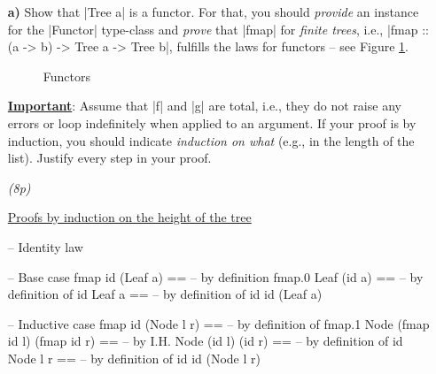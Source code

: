 \documentclass[a4,11pt]{article}
\newif\ifsol
\newcommand{\points}[1]{\hfill \textsl{({#1}p)}}
\begin{document}
\begin{enumerate}

\item[\textbf{a)}] %
  Show that |Tree a| is a functor. For that, you should \emph{provide} an
  instance for the |Functor| type-class and \emph{prove} that |fmap| for
  \emph{finite trees}, i.e., |fmap :: (a -> b) -> Tree a -> Tree b|, fulfills
  the laws for functors -- see Figure \ref{fig:functor}.

  \begin{figure}[t]
  \caption{Functors \label{fig:functor}}
  \end{figure}


   \ifsol
   \begin{code}
   instance Functor Tree where
       fmap  f  (Leaf a)      =  Leaf (f a)
       fmap  f  (Node t1 t2)  =  Node (fmap f t1) (fmap f t2)
   \end{code}
   \fi


  \underline{\textbf{Important}}:
  Assume that |f| and |g| are total, i.e., they do not raise any errors or loop
  indefinitely when applied to an argument. If your proof is by induction,
  you should indicate \emph{induction on what} (e.g., in the length of the
  list). Justify every step in your proof.

  \points{8}

  \ifsol
  \underline{Proofs by induction on the height of the tree}

  \begin{code}
  -- Identity law

  -- Base case
      fmap id (Leaf a)          ==
  --  { by definition fmap.0 }
      Leaf (id a)               ==
  --  { by definition of id }
      Leaf a                    ==
  --  { by definition of id }
      id (Leaf a)

  -- Inductive case
      fmap id (Node l r)            ==
  --  { by definition of fmap.1 }
      Node (fmap id l) (fmap id r)  ==
  --  { by I.H. }
      Node (id l) (id r)            ==
  --  { by definition of id }
      Node l r                      ==
  --  { by definition of id }
      id (Node l r)



\end{code}
\end{enumerate}
\end{document}
